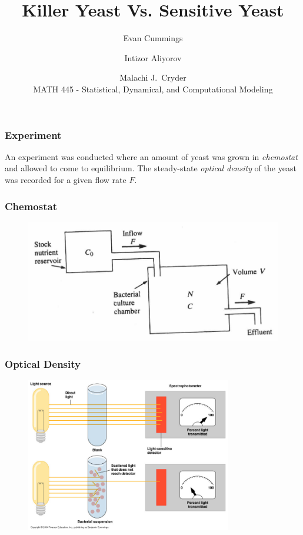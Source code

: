 \documentclass{beamer}
\title{Killer Yeast Vs. Sensitive Yeast}
\author{Evan Cummings \and Intizor Aliyorov \and Malachi J.\ Cryder\\
\vspace{5mm}
MATH 445 - Statistical, Dynamical, and Computational Modeling}
\begin{document}
\frame{\titlepage}

\begin{frame}
  \frametitle{Experiment}
  An experiment was conducted where an amount of yeast was grown in \emph{chemostat} and allowed to come to equilibrium.  The steady-state \emph{optical density} of the yeast was recorded for a given flow rate $F$.
\end{frame}

\begin{frame}
  \frametitle{Chemostat}
  \begin{figure}[H]
    \centering
      \includegraphics[width=1.0\textwidth]{images/chemostat.png}
  \end{figure}
\end{frame}

\begin{frame}
  \frametitle{Optical Density}
  \begin{figure}[H]
    \centering
      \includegraphics[width=0.8\textwidth]{images/optical_density.jpg}
  \end{figure}
\end{frame}
\end{document}
